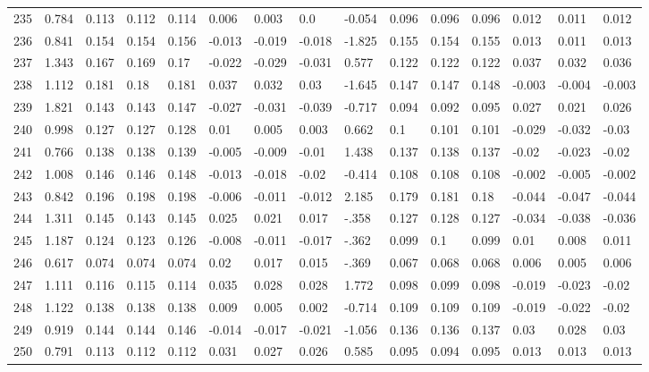 \begin{table}
\begin{tabular}{|l|l|lll|lll|l|lll|lll}
		235 & 0.784 & 0.113 & 0.112 & 0.114 & 0.006 & 0.003 & 0.0 & -0.054 & 0.096 & 0.096 & 0.096 & 0.012 & 0.011 & 0.012 \\
		236 & 0.841 & 0.154 & 0.154 & 0.156 & -0.013 & -0.019 & -0.018 & -1.825 & 0.155 & 0.154 & 0.155 & 0.013 & 0.011 & 0.013 \\
		237 & 1.343 & 0.167 & 0.169 & 0.17 & -0.022 & -0.029 & -0.031 & 0.577 & 0.122 & 0.122 & 0.122 & 0.037 & 0.032 & 0.036 \\
		238 & 1.112 & 0.181 & 0.18 & 0.181 & 0.037 & 0.032 & 0.03 & -1.645 & 0.147 & 0.147 & 0.148 & -0.003 & -0.004 & -0.003 \\
		239 & 1.821 & 0.143 & 0.143 & 0.147 & -0.027 & -0.031 & -0.039 & -0.717 & 0.094 & 0.092 & 0.095 & 0.027 & 0.021 & 0.026 \\
		240 & 0.998 & 0.127 & 0.127 & 0.128 & 0.01 & 0.005 & 0.003 & 0.662 & 0.1 & 0.101 & 0.101 & -0.029 & -0.032 & -0.03 \\
		241 & 0.766 & 0.138 & 0.138 & 0.139 & -0.005 & -0.009 & -0.01 & 1.438 & 0.137 & 0.138 & 0.137 & -0.02 & -0.023 & -0.02 \\
		242 & 1.008 & 0.146 & 0.146 & 0.148 & -0.013 & -0.018 & -0.02 & -0.414 & 0.108 & 0.108 & 0.108 & -0.002 & -0.005 & -0.002 \\
		243 & 0.842 & 0.196 & 0.198 & 0.198 & -0.006 & -0.011 & -0.012 & 2.185 & 0.179 & 0.181 & 0.18 & -0.044 & -0.047 & -0.044 \\
		244 & 1.311 & 0.145 & 0.143 & 0.145 & 0.025 & 0.021 & 0.017 & -.358 & 0.127 & 0.128 & 0.127 & -0.034 & -0.038 & -0.036 \\
		245 & 1.187 & 0.124 & 0.123 & 0.126 & -0.008 & -0.011 & -0.017 & -.362 & 0.099 & 0.1 & 0.099 & 0.01 & 0.008 & 0.011 \\
		246 & 0.617 & 0.074 & 0.074 & 0.074 & 0.02 & 0.017 & 0.015 & -.369 & 0.067 & 0.068 & 0.068 & 0.006 & 0.005 & 0.006 \\
		247 & 1.111 & 0.116 & 0.115 & 0.114 & 0.035 & 0.028 & 0.028 & 1.772 & 0.098 & 0.099 & 0.098 & -0.019 & -0.023 & -0.02 \\
		248 & 1.122 & 0.138 & 0.138 & 0.138 & 0.009 & 0.005 & 0.002 & -0.714 & 0.109 & 0.109 & 0.109 & -0.019 & -0.022 & -0.02 \\
		249 & 0.919 & 0.144 & 0.144 & 0.146 & -0.014 & -0.017 & -0.021 & -1.056 & 0.136 & 0.136 & 0.137 & 0.03 & 0.028 & 0.03 \\
		250 & 0.791 & 0.113 & 0.112 & 0.112 & 0.031 & 0.027 & 0.026 & 0.585 & 0.095 & 0.094 & 0.095 & 0.013 & 0.013 & 0.013 \\
	\end{tabular}
\end{table}

